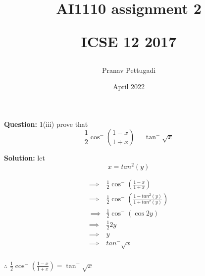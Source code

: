 \documentclass[journal,12pt,twocolumn]{IEEEtran}
\title{AI1110 assignment 2 

ICSE 12 2017}
\author{Pranav Pettugadi}
\date{April 2022}
\begin{document}


\providecommand{\brak}[1]{\ensuremath{\left(#1\right)}}
\providecommand{\lbrak}[1]{\ensuremath{\left(#1\right.}}
\providecommand{\rbrak}[1]{\ensuremath{\left.#1\right)}}

\newcommand{\question}{\noindent \textbf{Question: }}	
\newcommand{\solution}{\noindent \textbf{Solution: }}
\maketitle
\question {1(iii)} prove that $$\frac{1}{2}\cos^-\brak{\frac{1-x}{1+x}} = \tan^-{\sqrt{x}}$$

\solution
let$$ x= tan^2(y)$$

\begin{align*}
\implies&\frac{1}{2}\cos^-\brak{\frac{1-x}{1+x}}\\
\implies&\frac{1}{2}\cos^-\brak{\frac{1-tan^2(y)}{1+tan^2(y)}}\\\
\implies&\frac{1}{2}\cos^-({\cos{2y}})\\
\implies&\frac{1}{2} 2y\\
\implies&y\\
\implies&tan^-\sqrt{x}\\
\end{align*}

$\therefore$ $\frac{1}{2}\cos^-\brak{\frac{1-x}{1+x}} = \tan^-{\sqrt{x}}$
\end{document}
